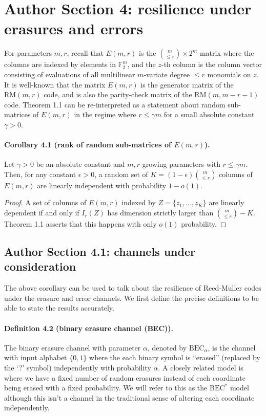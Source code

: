 \documentclass[10pt,a4paper]{article}
\begin{document}
\section*{Author Section 4: resilience under erasures and errors}
For parameters $m,r$, recall that $E(m,r)$ is the $\binom m{\le r}\times2^m$-matrix where the columns are indexed by elements in $\mathbb F_2^m$, and the $z$-th column is the column vector consisting of evaluations of all multilinear $m$-variate degree $\le r$ monomials on $z$. It is well-known that the matrix $E(m,r)$ is the generator matrix of the $\mathrm{RM}(m,r)$ code, and is also the parity-check matrix of the $\mathrm{RM}(m,m-r-1)$ code. Theorem 1.1 can be re-interpreted as a statement about random sub-matrices of $E(m,r)$ in the regime where $r\le\gamma m$ for a small absolute constant $\gamma>0$.
\paragraph{Corollary 4.1 (rank of random sub-matrices of $E(m,r)$).} Let $\gamma>0$ be an absolute constant and $m,r$ growing parameters with $r\le\gamma m$. Then, for any constant $\epsilon>0$, a random set of $K=(1-\epsilon)\binom m{\le r}$ columns of $E(m,r)$ are linearly independent with probability $1-o(1)$.
\begin{proof}A set of columns of $E(m,r)$ indexed by $Z=\{z_1,\ldots,z_K\}$ are linearly dependent if and only if $I_r(Z)$ has dimension strictly larger than $\binom m{\le r}-K$. Theorem 1.1 asserts that this happens with only $o(1)$ probability.\end{proof}
\subsection*{Author Section 4.1: channels under consideration}
The above corollary can be used to talk about the resilience of Reed-Muller codes under the erasure and error channels. We first define the precise definitions to be able to state the results accurately.
\paragraph{Definition 4.2 (binary erasure channel (BEC)).} The binary erasure channel with parameter $\alpha$, denoted by $\mathrm{BEC}_\alpha$, is the channel with input alphabet $\{0,1\}$ where the each binary symbol is ``erased'' (replaced by the `?' symbol) independently with probability $\alpha$.
A closely related model is where we have a fixed number of random erasures instead of each coordinate being erased with a fixed probability. We will refer to this as the $\mathrm{BEC}^*$ model although this isn't a channel in the traditional sense of altering each coordinate independently.
\end{document}

